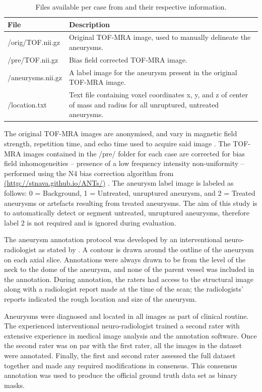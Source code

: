 \begin{table}[h]
	\centering
	\begin{tabular}{| l | p{8cm} |}
	\hline
	\textbf{File} & \textbf{Description} \\
	\hline
	/orig/TOF.nii.gz & Original TOF-MRA image, used to manually delineate the aneurysms. \\
	\hline
	/pre/TOF.nii.gz & Bias field corrected TOF-MRA image. \\
	\hline
	/aneurysms.nii.gz & A label image for the aneurysm present in the original TOF-MRA image.\\
	\hline
	/location.txt & Text file containing voxel coordinates x, y, and z of center of mass and radius for all unruptured, untreated aneurysms. \\
	\hline
	\end{tabular}
	\caption[Table of files contained dataset]{Files available per case from  and their respective information.}
	\label{table:adam_files}
\end{table}

The original TOF-MRA images are anonymised, and vary in magnetic field strength, repetition time, and echo time used to acquire said image . The TOF-MRA images contained in the /pre/ folder for each case are corrected for bias field inhomogeneities -- presence of a low frequency intensity non-uniformity -- performed using the N4 bias correction algorithm from \href{http://stnava.github.io/ANTs/}{(http://stnava.github.io/ANTs/)} \cite{Tustison2010}. The aneurysm label image is labeled as follows: 0 = Background, 1 = Untreated, unruptured aneurysm, and 2 = Treated aneurysms or artefacts resulting from treated aneurysms. The aim of this study is to automatically detect or segment untreated, unruptured aneurysms, therefore label 2 is not required and is ignored during evaluation. 

The aneurysm annotation protocol was developed by an interventional neuro-radiologist as stated by . A contour is drawn around the outline of the aneurysm on each axial slice. Annotations were always drawn to be from the level of the neck to the dome of the aneurysm, and none of the parent vessel was included in the annotation. During annotation, the raters had access to the structural image along with a radiologist report made at the time of the scan; the radiologists’ reports indicated the rough location and size of the aneurysm.

Aneurysms were diagnosed and located in all images as part of clinical routine. The experienced interventional neuro-radiologist trained a second rater with extensive experience in medical image analysis and the annotation software. Once the second rater was on par with the first rater, all the images in the dataset were annotated. Finally, the first and second rater assessed the full dataset together and made any required modifications in consensus. This consensus annotation was used to produce the official ground truth data set as binary masks.


